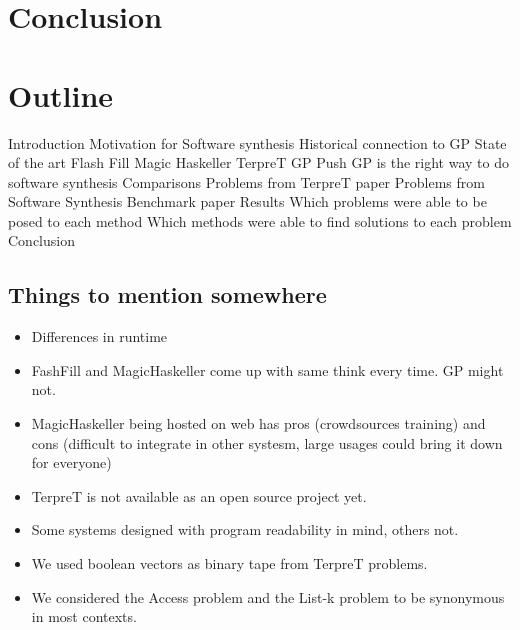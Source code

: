 \section{Conclusion}


\section{Outline}

\begin{outline}
 \1 Introduction
   \2 Motivation for Software synthesis
   \2 Historical connection to GP
 \1 State of the art
  \2 Flash Fill
  \2 Magic Haskeller
  \2 TerpreT
  \2 GP
   \3 Push GP is the right way to do software synthesis
 \1 Comparisons
  \2 Problems from TerpreT paper
  \2 Problems from Software Synthesis Benchmark paper
 \1 Results
  \2 Which problems were able to be posed to each method
  \2 Which methods were able to find solutions to each problem
 \1 Conclusion
\end{outline}

\subsection{Things to mention somewhere}
\begin{itemize}
 \item Differences in runtime
 \item FashFill and MagicHaskeller come up with same think every time. GP might not.
 \item MagicHaskeller being hosted on web has pros (crowdsources training) and cons (difficult to integrate in other systesm, large usages could bring it down for everyone)
 \item TerpreT is not available as an open source project yet.
 \item Some systems designed with program readability in mind, others not.
 \item We used boolean vectors as binary tape from TerpreT problems.
 \item We considered the Access problem and the List-k problem to be synonymous in most contexts.
\end{itemize}